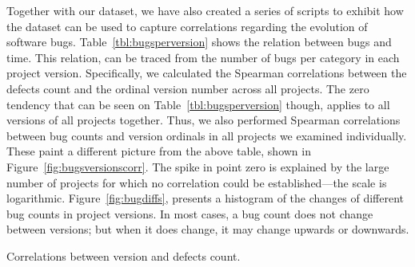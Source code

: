 \documentclass{sig-alternate}
\begin{document}

Together with our dataset, we have also created a series of
scripts to exhibit how the dataset can be used
to capture correlations regarding
the evolution of software bugs.
Table~\ref{tbl:bugsperversion} shows the relation between
bugs and time. This relation, can be traced from the number of
bugs per category in each project version. Specifically, we
calculated the Spearman correlations between the defects
count and the ordinal version number across all projects.
The zero tendency that can be seen on Table~\ref{tbl:bugsperversion}
though, applies to all versions of all projects together.
Thus, we also performed Spearman correlations between bug counts and version
ordinals in all projects we examined individually. These paint a different picture
from the above table, shown in Figure~\ref{fig:bugsversionscorr}. The
spike in point zero is explained by the large number of projects for
which no correlation could be established---the scale is
logarithmic.
Figure~\ref{fig:bugdiffs}, presents a histogram of the changes
of different bug counts in
project versions. In most cases, a bug count does not change between
versions; but when it does change, it may change upwards or downwards.

\begin{table}[tphp]
    \centering
        
	\caption{Correlations between version and defects count.}
    \label{tbl:bugsperversion}
\end{table}
\end{document}
